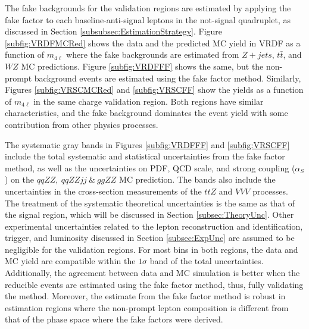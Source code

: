 The fake backgrounds for the validation regions are estimated by applying the fake factor to each baseline-anti-signal leptons in the not-signal quadruplet, as discussed in Section \ref{subsubsec:EstimationStrategy}. Figure \ref{subfig:VRDFMCRed} shows the data and the predicted MC yield in VRDF as a function of $m_{4\ell}$ where the fake backgrounds are estimated from $Z+jets$, $t\bar{t}$, and $WZ$ MC predictions. Figure \ref{subfig:VRDFFF} shows the same, but the non-prompt background events are estimated using the fake factor method. Similarly, Figures \ref{subfig:VRSCMCRed} and \ref{subfig:VRSCFF} show the yields as a function of $m_{4\ell}$ in the same charge validation region. Both regions have similar characteristics, and the fake background dominates the event yield with some contribution from other physics processes.

The systematic gray bands in Figures \ref{subfig:VRDFFF} and \ref{subfig:VRSCFF} include the total systematic and statistical uncertainties from the fake factor method, as well as the uncertainties on PDF, QCD scale, and strong coupling ($\alpha_{S}$) on the $qqZZ,~qqZZjj~\&~ggZZ$ MC prediction. The bands also include the uncertainties in the cross-section measurements of the $ttZ$ and $VVV$ processes. The treatment of the systematic theoretical uncertainties is the same as that of the signal region, which will be discussed in Section \ref{subsec:TheoryUnc}. Other experimental uncertainties related to the lepton reconstruction and identification, trigger, and luminosity discussed in Section \ref{subsec:ExpUnc} are assumed to be negligible for the validation regions. For most bins in both regions, the data and MC yield are compatible within the $1\sigma$ band of the total uncertainties. Additionally, the agreement between data and MC simulation is better when the reducible events are estimated using the fake factor method, thus, fully validating the method. Moreover, the estimate from the fake factor method is robust in estimation regions where the non-prompt lepton composition is different from that of the phase space where the fake factors were derived.


